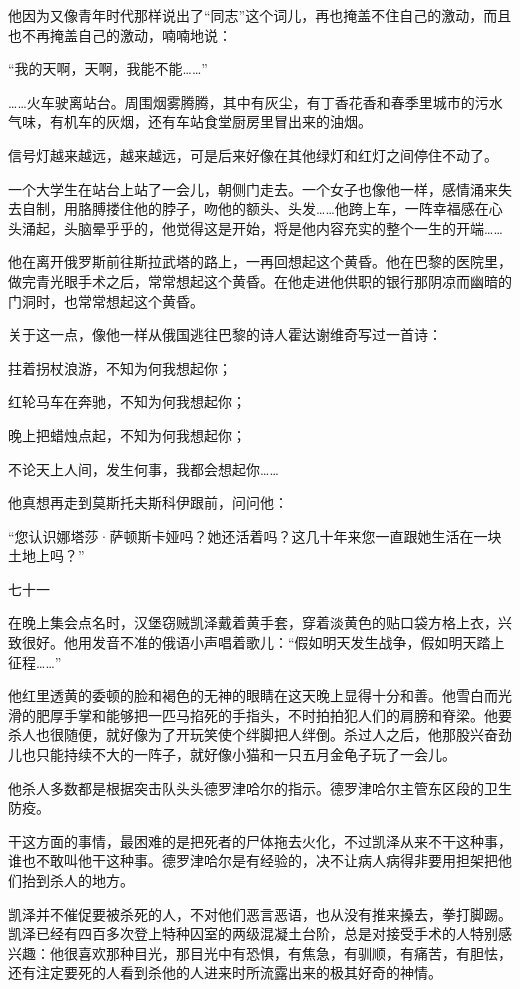 他因为又像青年时代那样说出了“同志”这个词儿，再也掩盖不住自己的激动，而且也不再掩盖自己的激动，喃喃地说：

“我的天啊，天啊，我能不能……”

……火车驶离站台。周围烟雾腾腾，其中有灰尘，有丁香花香和春季里城市的污水气味，有机车的灰烟，还有车站食堂厨房里冒出来的油烟。

信号灯越来越远，越来越远，可是后来好像在其他绿灯和红灯之间停住不动了。

一个大学生在站台上站了一会儿，朝侧门走去。一个女子也像他一样，感情涌来失去自制，用胳膊搂住他的脖子，吻他的额头、头发……他跨上车，一阵幸福感在心头涌起，头脑晕乎乎的，他觉得这是开始，将是他内容充实的整个一生的开端……

他在离开俄罗斯前往斯拉武塔的路上，一再回想起这个黄昏。他在巴黎的医院里，做完青光眼手术之后，常常想起这个黄昏。在他走进他供职的银行那阴凉而幽暗的门洞时，也常常想起这个黄昏。

关于这一点，像他一样从俄国逃往巴黎的诗人霍达谢维奇写过一首诗：

拄着拐杖浪游，不知为何我想起你；

红轮马车在奔驰，不知为何我想起你；

晚上把蜡烛点起，不知为何我想起你；

不论天上人间，发生何事，我都会想起你……

他真想再走到莫斯托夫斯科伊跟前，问问他：

“您认识娜塔莎·萨顿斯卡娅吗？她还活着吗？这几十年来您一直跟她生活在一块土地上吗？”

七十一

在晚上集会点名时，汉堡窃贼凯泽戴着黄手套，穿着淡黄色的贴口袋方格上衣，兴致很好。他用发音不准的俄语小声唱着歌儿：“假如明天发生战争，假如明天踏上征程……”

他红里透黄的委顿的脸和褐色的无神的眼睛在这天晚上显得十分和善。他雪白而光滑的肥厚手掌和能够把一匹马掐死的手指头，不时拍拍犯人们的肩膀和脊梁。他要杀人也很随便，就好像为了开玩笑使个绊脚把人绊倒。杀过人之后，他那股兴奋劲儿也只能持续不大的一阵子，就好像小猫和一只五月金龟子玩了一会儿。

他杀人多数都是根据突击队头头德罗津哈尔的指示。德罗津哈尔主管东区段的卫生防疫。

干这方面的事情，最困难的是把死者的尸体拖去火化，不过凯泽从来不干这种事，谁也不敢叫他干这种事。德罗津哈尔是有经验的，决不让病人病得非要用担架把他们抬到杀人的地方。

凯泽并不催促要被杀死的人，不对他们恶言恶语，也从没有推来搡去，拳打脚踢。凯泽已经有四百多次登上特种囚室的两级混凝土台阶，总是对接受手术的人特别感兴趣：他很喜欢那种目光，那目光中有恐惧，有焦急，有驯顺，有痛苦，有胆怯，还有注定要死的人看到杀他的人进来时所流露出来的极其好奇的神情。

